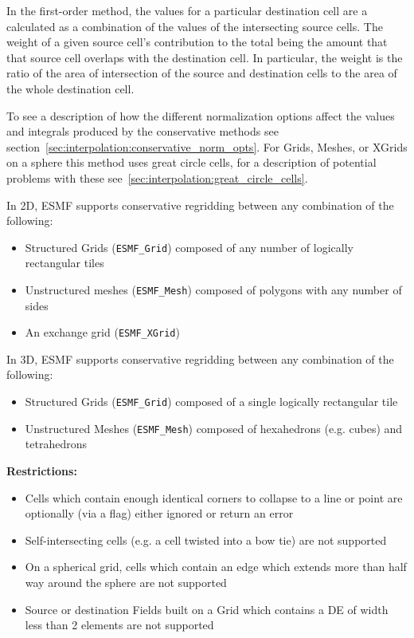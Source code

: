  In the first-order method, the values for a particular destination cell are a calculated as a combination of the values of the intersecting 
 source cells. The weight of a given source cell's contribution 
 to the total being the amount that that source cell overlaps with the destination cell. 
 In particular, the weight is the ratio of the area of intersection of the source and destination cells to the area of the whole destination cell. 

 To see a description of how the different normalization options affect the values and integrals produced by the conservative methods see section~\ref{sec:interpolation:conservative_norm_opts}. For Grids, Meshes, or XGrids on a sphere this method uses great circle cells, for a description of potential problems with these see~\ref{sec:interpolation:great_circle_cells}.

\smallskip

 In 2D, ESMF supports conservative regridding between any combination of the following:
 \begin{itemize}
 \item Structured Grids ({\tt ESMF\_Grid}) composed of any number of logically rectangular tiles
 \item Unstructured meshes ({\tt ESMF\_Mesh}) composed of polygons with any number of sides
 \item An exchange grid ({\tt ESMF\_XGrid})
 \end{itemize}

\smallskip

 In 3D, ESMF supports conservative regridding between any combination of the following:
 \begin{itemize}
 \item Structured Grids ({\tt ESMF\_Grid}) composed of a single logically rectangular tile
 \item Unstructured Meshes ({\tt ESMF\_Mesh}) composed of hexahedrons (e.g. cubes) and tetrahedrons
 \end{itemize}

\smallskip

{\bf Restrictions:}
 \begin{itemize}
 \item Cells which contain enough identical corners to collapse to a line or point are optionally (via a flag) either ignored or return an error
 \item Self-intersecting cells (e.g. a cell twisted into a bow tie) are not supported
 \item On a spherical grid, cells which contain an edge which extends more than half way around the sphere are not supported 
 \item Source or destination Fields built on a Grid which contains a DE of width less than 2 elements are not supported
 \end{itemize}

